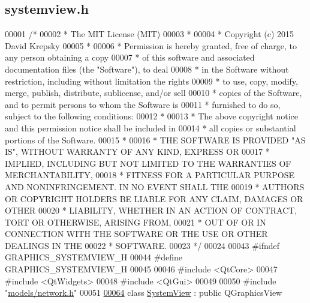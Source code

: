 \hypertarget{systemview_8h_source}{}\subsection{systemview.\+h}
\label{systemview_8h_source}

\begin{DoxyCode}
00001 \textcolor{comment}{/*}
00002 \textcolor{comment}{ * The MIT License (MIT)}
00003 \textcolor{comment}{ *}
00004 \textcolor{comment}{ * Copyright (c) 2015 David Krepsky}
00005 \textcolor{comment}{ *}
00006 \textcolor{comment}{ * Permission is hereby granted, free of charge, to any person obtaining a copy}
00007 \textcolor{comment}{ * of this software and associated documentation files (the "Software"), to deal}
00008 \textcolor{comment}{ * in the Software without restriction, including without limitation the rights}
00009 \textcolor{comment}{ * to use, copy, modify, merge, publish, distribute, sublicense, and/or sell}
00010 \textcolor{comment}{ * copies of the Software, and to permit persons to whom the Software is}
00011 \textcolor{comment}{ * furnished to do so, subject to the following conditions:}
00012 \textcolor{comment}{ *}
00013 \textcolor{comment}{ * The above copyright notice and this permission notice shall be included in}
00014 \textcolor{comment}{ * all copies or substantial portions of the Software.}
00015 \textcolor{comment}{ *}
00016 \textcolor{comment}{ * THE SOFTWARE IS PROVIDED "AS IS", WITHOUT WARRANTY OF ANY KIND, EXPRESS OR}
00017 \textcolor{comment}{ * IMPLIED, INCLUDING BUT NOT LIMITED TO THE WARRANTIES OF MERCHANTABILITY,}
00018 \textcolor{comment}{ * FITNESS FOR A PARTICULAR PURPOSE AND NONINFRINGEMENT. IN NO EVENT SHALL THE}
00019 \textcolor{comment}{ * AUTHORS OR COPYRIGHT HOLDERS BE LIABLE FOR ANY CLAIM, DAMAGES OR OTHER}
00020 \textcolor{comment}{ * LIABILITY, WHETHER IN AN ACTION OF CONTRACT, TORT OR OTHERWISE, ARISING FROM,}
00021 \textcolor{comment}{ * OUT OF OR IN CONNECTION WITH THE SOFTWARE OR THE USE OR OTHER DEALINGS IN THE}
00022 \textcolor{comment}{ * SOFTWARE.}
00023 \textcolor{comment}{ */}
00024 
00043 \textcolor{preprocessor}{#ifndef GRAPHICS\_SYSTEMVIEW\_H}
00044 \textcolor{preprocessor}{#define GRAPHICS\_SYSTEMVIEW\_H}
00045 
00046 \textcolor{preprocessor}{#include <QtCore>}
00047 \textcolor{preprocessor}{#include <QtWidgets>}
00048 \textcolor{preprocessor}{#include <QtGui>}
00049 
00050 \textcolor{preprocessor}{#include "\hyperlink{network_8h}{models/network.h}"}
00051 
\hypertarget{systemview_8h_source_l00064}{}\hyperlink{class_system_view}{00064} \textcolor{keyword}{class }\hyperlink{class_system_view}{SystemView} : \textcolor{keyword}{public} QGraphicsView

\end{DoxyCode}
